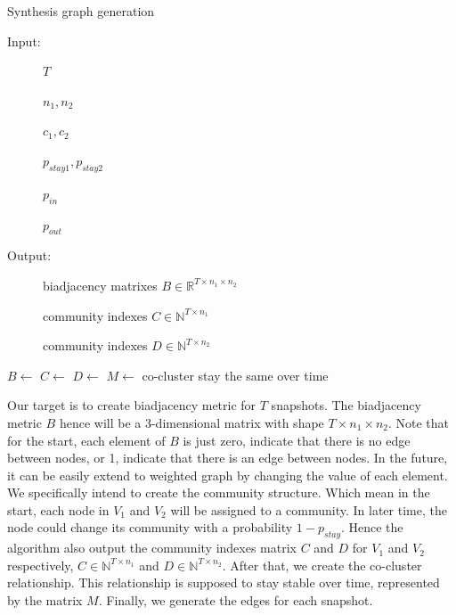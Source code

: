 \begin{algorithm}[H]
	\caption{Synthesis graph generation}
	\label{alg:synthesis_graph_all}
	\begin{description}
		\item[Input:] $T$ 
		\item[\phantom{Input:}] $n_1, n_2$ 
		\item[\phantom{Input:}] $c_1, c_2$ 
		\item[\phantom{Input:}] $p_{stay1}, p_{stay2}$ 
		\item[\phantom{Input:}] $p_{in}$ 
		\item[\phantom{Input:}] $p_{out}$ 
		\item[Output:] biadjacency matrixes $B \in \mathbb{R}^{T \times n_1 \times n_2}$
		\item[\phantom{Output:}] community indexes $C \in \mathbb{N}^{T \times n_1}$
		\item[\phantom{Output:}] community indexes $D \in \mathbb{N}^{T \times n_2}$
	\end{description}
	\begin{algorithmic}[1]
		\State $B \gets$ 
		\State $C \gets$ 
		\State $D \gets$ 
		\State $M \gets$ 
		\Comment co-cluster stay the same over time
		\State {}
		\EndFor
	\end{algorithmic}
\end{algorithm}

Our target is to create biadjacency metric for $T$ snapshots.
The biadjacency metric $B$ hence will be a 3-dimensional matrix with shape $T \times n_1 \times n_2$.
Note that for the start, each element of $B$ is just zero, indicate that there is no edge between nodes,
or 1, indicate that there is an edge between nodes.
In the future, it can be easily extend to weighted graph by changing the value of each element.
We specifically intend to create the community structure.
Which mean in the start, each node in $V_1$ and $V_2$ will be assigned to a community.
In later time, the node could change its community with a probability $1-p_{stay}$.
Hence the algorithm also output the community indexes matrix $C$ and $D$ for $V_1$ and $V_2$ respectively,
$C \in \mathbb{N}^{T \times n_1}$ and $D \in \mathbb{N}^{T \times n_2}$.
After that, we create the co-cluster relationship.
This relationship is supposed to stay stable over time, represented by the matrix $M$.
Finally, we generate the edges for each snapshot.

